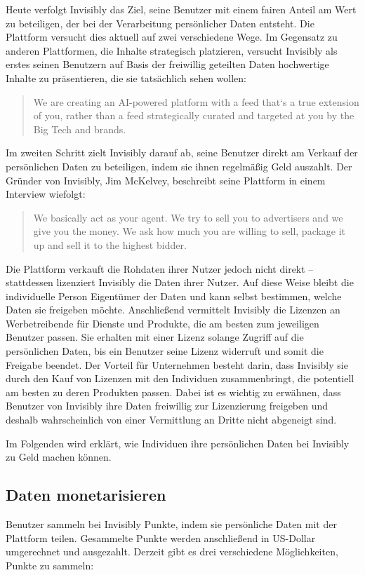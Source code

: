\noindent Heute verfolgt Invisibly das Ziel, seine Benutzer mit einem fairen Anteil am Wert zu beteiligen, der bei der Verarbeitung persönlicher Daten entsteht. Die Plattform versucht dies aktuell auf zwei verschiedene Wege. Im Gegensatz zu anderen Plattformen, die Inhalte strategisch platzieren, versucht Invisibly als erstes seinen Benutzern auf Basis der freiwillig geteilten Daten hochwertige Inhalte zu präsentieren, die sie tatsächlich sehen wollen: \begin{quote}
    We are creating an AI-powered platform with a feed that`s a true extension of you, rather than a feed strategically curated and targeted at you by the Big Tech and brands. \cite{invisiblyWhyPay_2021}
\end{quote} Im zweiten Schritt zielt Invisibly darauf ab, seine Benutzer direkt am Verkauf der persönlichen Daten zu beteiligen, indem sie ihnen regelmäßig Geld auszahlt. \cite{invisiblyWhyPay_2021} Der Gründer von Invisibly, Jim McKelvey, beschreibt seine Plattform in einem Interview wiefolgt: \begin{quote}
    We basically act as your agent. We try to sell you to advertisers and we give you the money. We ask how much you are willing to sell, package it up and sell it to the highest bidder. \cite{techRadarInvisibly_2021}
\end{quote} Die Plattform verkauft die Rohdaten ihrer Nutzer jedoch nicht direkt -- stattdessen lizenziert Invisibly die Daten ihrer Nutzer. Auf diese Weise bleibt die individuelle Person Eigentümer der Daten und kann selbst bestimmen, welche Daten sie freigeben möchte. \cite{invisiblyGetPaid_2021} Anschließend vermittelt Invisibly die Lizenzen an Werbetreibende für Dienste und Produkte, die am besten zum jeweiligen Benutzer passen. Sie erhalten mit einer Lizenz solange Zugriff auf die persönlichen Daten, bis ein Benutzer seine Lizenz widerruft und somit die Freigabe beendet. Der Vorteil für Unternehmen besteht darin, dass Invisibly sie durch den Kauf von Lizenzen mit den Individuen zusammenbringt, die potentiell am besten zu deren Produkten passen. \cite{techRadarInvisibly_2021} Dabei ist es wichtig zu erwähnen, dass Benutzer von Invisibly ihre Daten freiwillig zur Lizenzierung freigeben und deshalb wahrscheinlich von einer Vermittlung an Dritte nicht abgeneigt sind. \newline

\noindent Im Folgenden wird erklärt, wie Individuen ihre persönlichen Daten bei Invisibly zu Geld machen können.

\subsection{Daten monetarisieren}
Benutzer sammeln bei Invisibly Punkte, indem sie persönliche Daten mit der Plattform teilen. Gesammelte Punkte werden anschließend in US-Dollar umgerechnet und ausgezahlt. Derzeit gibt es drei verschiedene Möglichkeiten, Punkte zu sammeln: \newline

